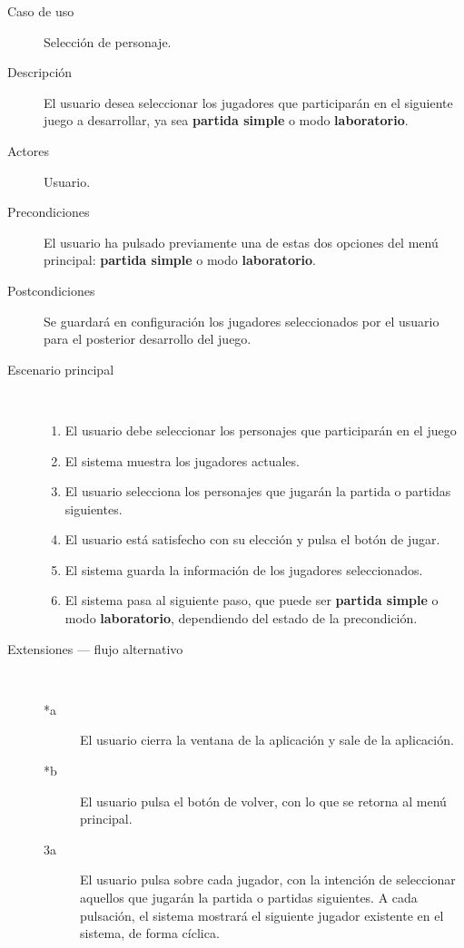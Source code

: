 \begin{description}
    \item[Caso de uso] Selección de personaje.
    \item[Descripción] El usuario desea seleccionar los jugadores que participarán en el siguiente juego
            a desarrollar, ya sea \textbf{partida simple} o modo \textbf{laboratorio}.
    \item[Actores] Usuario.
    \item[Precondiciones] El usuario ha pulsado previamente una de estas dos opciones del menú principal:
            \textbf{partida simple} o modo \textbf{laboratorio}.
    \item[Postcondiciones] Se guardará en configuración los jugadores seleccionados por el usuario para el
            posterior desarrollo del juego.
    \item[Escenario principal] $\quad$
        \begin{enumerate}
            \item El usuario debe seleccionar los personajes que participarán en el juego
            \item El sistema muestra los jugadores actuales.
            \item El usuario selecciona los personajes que jugarán la partida o partidas siguientes.
            \item El usuario está satisfecho con su elección y pulsa el botón de jugar.
            \item El sistema guarda la información de los jugadores seleccionados.
            \item El sistema pasa al siguiente paso, que puede ser \textbf{partida simple} o modo
                    \textbf{laboratorio}, dependiendo del estado de la precondición.
        \end{enumerate}
    \item[Extensiones --- flujo alternativo] $\quad$
        \begin{description}
            \item[*a ] El usuario cierra la ventana de la aplicación y sale de la aplicación.
            \item[*b ] El usuario pulsa el botón de volver, con lo que se retorna al menú principal.
            \item[3a ] El usuario pulsa sobre cada jugador, con la intención de seleccionar aquellos que
                    jugarán la partida o partidas siguientes. A cada pulsación, el sistema mostrará el
                    siguiente jugador existente en el sistema, de forma cíclica.
        \end{description}
\end{description}


